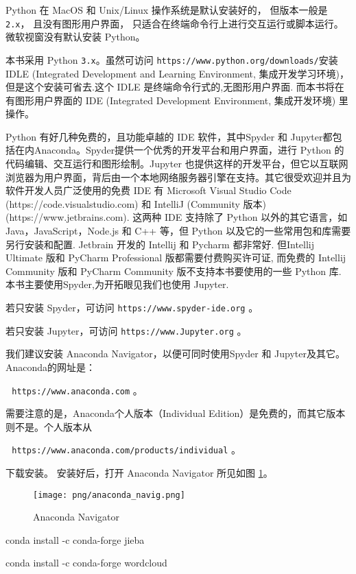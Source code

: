 \documentclass[main.tex]{subfiles}
\begin{document}
Python 在 MacOS 和 Unix/Linux 操作系统是默认安装好的，
但版本一般是 \texttt{2.x}，
且没有图形用户界面，
只适合在终端命令行上进行交互运行或脚本运行。
微软视窗没有默认安装 Python。

本书采用 Python \texttt{3.x}。虽然可访问 \texttt{https://www.python.org/downloads/}安装 IDLE (Integrated Development and Learning Environment, 集成开发学习环境)，但是这个安装可省去.这个 IDLE 是终端命令行式的,无图形用户界面.
而本书将在有图形用户界面的 IDE (Integrated Development Environment, 集成开发环境) 里操作。

Python 有好几种免费的，且功能卓越的 IDE 软件，其中Spyder 和 Jupyter都包括在内Anaconda。Spyder提供一个优秀的开发平台和用户界面，进行 Python 的代码编辑、交互运行和图形绘制。Jupyter 也提供这样的开发平台，但它以互联网浏览器为用户界面，背后由一个本地网络服务器引擎在支持。其它很受欢迎并且为软件开发人员广泛使用的免费 IDE 有 Microsoft Visual Studio Code (https://code.visualstudio.com) 和 IntelliJ (Community 版本) (https://www.jetbrains.com).
这两种 IDE 支持除了 Python 以外的其它语言，如 Java，JavaScript，Node.js 和 C++ 等，但 Python 以及它的一些常用包和库需要另行安装和配置. Jetbrain 开发的 Intellij 和 Pycharm 都非常好. 但Intellij Ultimate 版和 PyCharm Professional 版都需要付费购买许可证, 而免费的 Intellij Community 版和 PyCharm Community 版不支持本书要使用的一些 Python 库. 本书主要使用Spyder,为开拓眼见我们也使用 Jupyter.


若只安装 Spyder，可访问
\texttt{https://www.spyder-ide.org} 。

若只安装 Jupyter，可访问
\texttt{https://www.Jupyter.org} 。

我们建议安装 Anaconda Navigator，以便可同时使用Spyder 和 Jupyter及其它。 Anaconda的网址是：

\,\,\,\,\texttt{https://www.anaconda.com} 。

\noindent 需要注意的是，Anaconda个人版本（Individual Edition）是免费的，而其它版本则不是。个人版本从

\,\,\,\,\texttt{https://www.anaconda.com/products/individual} 。

\noindent 下载安装。
安装好后，打开 Anaconda Navigator 所见如图 \ref{fig:2.1.1}。

\begin{figure}[h]
	\texttt{[image: png/anaconda\_navig.png]}
	\caption{Anaconda Navigator}\label{fig:2.1.1}
\end{figure}


conda install -c conda-forge jieba 

conda install -c conda-forge wordcloud
\end{document}
